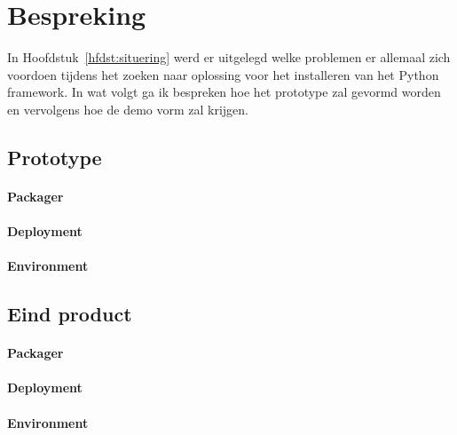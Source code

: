 \chapter{Bespreking}
In Hoofdstuk~\vref{hfdst:situering} werd er uitgelegd welke problemen er allemaal zich voordoen tijdens het zoeken naar oplossing voor het installeren van het Python framework. 
In wat volgt ga ik bespreken hoe het prototype zal gevormd worden en vervolgens hoe de demo vorm zal krijgen.

\section{Prototype}

\subsubsection{Packager}
\subsubsection{Deployment}
\subsubsection{Environment}

\section{Eind product}

\subsubsection{Packager}
\subsubsection{Deployment}
\subsubsection{Environment}
